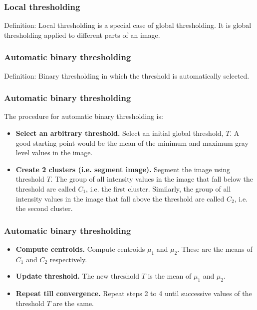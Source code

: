 \begin{frame}
\frametitle{Local thresholding}
\logoCSIPCPL\mypagenum
	\begin{block}{Definition:} 
		Local thresholding is a special case of global thresholding.  It is global thresholding applied to different parts of an image.
	\end{block}
\end{frame}





\begin{frame}
\frametitle{Automatic binary thresholding}
\logoCSIPCPL\mypagenum
	\begin{block}{Definition:}
		Binary thresholding in which the threshold is automatically selected.
	\end{block}
\end{frame}





\begin{frame}\frametitle{Automatic binary thresholding}\logoCSIPCPL\mypagenum
	The procedure for automatic binary thresholding is:
	\begin{itemize}
		\item \textbf{Select an arbitrary threshold.}  Select an initial global threshold, $T$. A good starting point would be the mean of the minimum and maximum gray level values in the image.
		\item \textbf{Create 2 clusters (i.e. segment image).}  Segment the image using threshold $T$. The group of all intensity values in the image that fall below the threshold are called $C_1$, i.e. the first cluster. Similarly, the group of all intensity values in the image that fall above the threshold are called $C_2$, i.e. the second cluster.
	\end{itemize}
\end{frame}


\begin{frame}
\frametitle{Automatic binary thresholding}
\logoCSIPCPL\mypagenum
	\begin{itemize}
		\item \textbf{Compute centroids.}  Compute centroids $\mu_1$ and $\mu_2$.  These are the means of $C_1$ and $C_2$ respectively.
		\item \textbf{Update threshold.}  The new threshold $T$ is the mean of $\mu_1$ and $\mu_2$.
		\item \textbf{Repeat till convergence.}  Repeat steps 2 to 4 until successive values of the threshold $T$ are the same.
	\end{itemize}
\end{frame}







